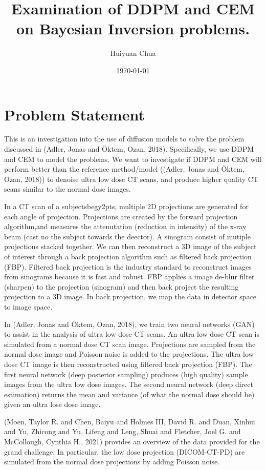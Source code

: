 \documentclass[a4paper, 11pt]{article}
\author{Huiyuan Chua}
\date{\today}
\title{Examination of DDPM and CEM on Bayesian Inversion problems.}
\begin{document}
\maketitle
\tableofcontents


\section{Problem Statement}
\label{sec:org0e26f15}
This is an investigation into the use of diffusion models to solve the problem discussed in (Adler, Jonas and Öktem, Ozan, 2018). Specifically, we use DDPM and CEM to model the problems. We want to investigate if DDPM and CEM will perform better than the reference method/model ((Adler, Jonas and Öktem, Ozan, 2018)) to denoise ultra low dose CT scans, and produce higher quality CT scans similar to the normal dose images.

In a CT scan of a subjectsbegy2pts, multiple 2D projections are generated for each angle of projection. Projections are created by the forward projection algorithm,and measures the attenutation (reduction in intensity) of the x-ray beam (cast no the subject towards the deector). A sinogram consist of mutiple projections stacked together. We can then reconstruct a 3D image of the subject of interest through a back projection algorithm such as filtered back projection (FBP). Filtered back projection is the industry standard to reconstruct images from sinograms because it is fast and robust. FBP applies a image de-blur filter (sharpen) to the projection (sinogram) and then back project the resulting projection to a 3D image. In back projection, we map the data in detector space to image space.

In (Adler, Jonas and Öktem, Ozan, 2018), we train two neural networks (GAN) to assist in the analysis of ultra low dose CT scans. An ultra low dose CT scan is simulated from a normal dose CT scan image. Projections are sampled from the normal dose image and Poisson noise is added to the projections. The ultra low dose CT image is then reconstructed using filtered back projection (FBP). The first neural network (deep posterior sampling) produces (high quality) sample images from the ultra low dose images. The second neural network (deep direct estimation) returns the mean and variance (of what the normal dose should be) given an ultra lose dose image.

(Moen, Taylor R. and Chen, Baiyu and Holmes III, David R. and Duan, Xinhui and Yu, Zhicong and Yu, Lifeng and Leng, Shuai and Fletcher, Joel G. and McCollough, Cynthia H., 2021) provides an overview of the data provided for the grand challenge. In particular, the low dose projection (DICOM-CT-PD) are simulated from the normal dose projections by adding Poisson noise.
\end{document}
